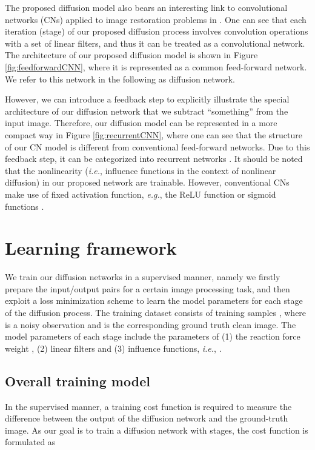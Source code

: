 \documentclass[10pt,journal,compsoc]{IEEEtran}
\newcommand{\eg}{\emph{e.g.}}
\newcommand{\ie}{\emph{i.e.}}
\begin{document}
The proposed diffusion model also bears an interesting link to 
convolutional networks (CNs) applied to 
image restoration problems in \cite{CNNdenoising}. One can see that 
each iteration (stage) of our proposed diffusion process involves convolution 
operations with a set of linear filters, 
and thus it can be treated as a convolutional network. 
The architecture of our proposed diffusion model is shown in Figure \ref{fig:feedforwardCNN}, where it is represented as 
a common feed-forward network. We refer to this network in the following as diffusion network. 

However, we can introduce a feedback step to explicitly illustrate the special 
architecture of our diffusion network that we subtract ``something'' from the input image. Therefore, our diffusion model 
can be represented in a more compact way in Figure \ref{fig:recurrentCNN}, 
where one can see that the structure of our CN model is different from conventional feed-forward networks. 
Due to this feedback step, it can be categorized into recurrent networks \cite{graves2009offline}. 
It should be noted that the nonlinearity (\ie, influence functions in the context of nonlinear diffusion) 
in our proposed network are trainable. However, conventional CNs make use of 
fixed activation function, \eg, the ReLU function 
\cite{nair2010rectified} or sigmoid functions 
\cite{CNNdenoising}. 

\section{Learning framework}
We train our diffusion networks in a supervised manner, namely we firstly prepare the input/output pairs 
for a certain image processing task, and then 
exploit a loss minimization scheme to learn the model parameters  for each 
stage  of the diffusion process. The training dataset consists of 
 training samples , where 
 is a noisy observation and  is the corresponding ground truth clean image. 
The model parameters  of each stage include the parameters of (1) the reaction force weight , 
(2) linear filters and (3) influence functions, \ie, . 

\subsection{Overall training model}
In the supervised manner, a training cost function is required 
to measure the difference between the output of the diffusion 
network and the ground-truth image. As our goal is to train a diffusion network with  stages, the cost function is formulated as 
\end{document}
